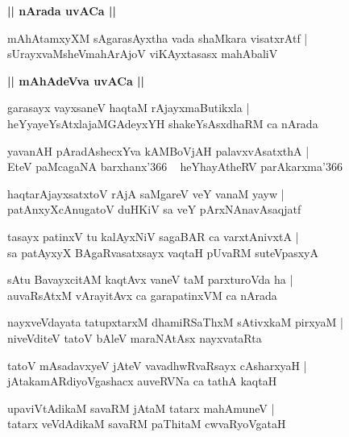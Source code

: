 \documentclass[twoside,12pt,openright]{book}
\newcounter{shloka}[chapter]
\def\uvaca#1{\centerline{{\large\textbf{#1}}}}
\begin{document}
\uvaca{|| nArada uvACa ||}

\begin{shloka}%
mAhAtamxyXM sAgarasAyxtha vada shaMkara visatxrAtf |\\
sUrayxvaMsheVmahArAjoV viKAyxtasasx mahAbaliV 
\end{shloka}

\uvaca{|| mAhAdeVva uvACa ||}

\begin{shloka}%
garasayx vayxsaneV haqtaM rAjayxmaButikxla |\\
heYyayeYsAtxlajaMGAdeyxYH shakeYsAsxdhaRM ca nArada
\end{shloka}

\begin{shloka}%
yavanAH pAradAshecxYva kAMBoVjAH palavxvAsatxthA |\\
EteV paMcagaNA barxhanx\char'366 ~ heYhayAtheRV parAkarxma\char'366 ~
\end{shloka}

\begin{shloka}%
haqtarAjayxsatxtoV rAjA saMgareV veY vanaM yayw |\\
patAnxyXcAnugatoV duHKiV sa veY pArxNAnavAsaqjatf
\end{shloka}

\begin{shloka}%
tasayx patinxV tu kalAyxNiV sagaBAR ca varxtAnivxtA |\\
sa patAyxyX BAgaRvasatxsayx vaqtaH pUvaRM suteVpasxyA 
\end{shloka}

\begin{shloka}%
sAtu BavayxcitAM kaqtAvx vaneV taM parxturoVda ha |\\
auvaRsAtxM vArayitAvx ca garapatinxVM ca nArada 
\end{shloka}

\begin{shloka}%
nayxveVdayata tatupxtarxM dhamiRSaThxM sAtivxkaM pirxyaM |\\
niveVditeV tatoV bAleV maraNAtAsx nayxvataRta 
\end{shloka}

\begin{shloka}%
tatoV mAsadavxyeV jAteV vavadhwRvaRsayx cAsharxyaH |\\
jAtakamARdiyoVgashacx auveRVNa ca tathA kaqtaH 
\end{shloka}

\begin{shloka}%
upaviVtAdikaM savaRM jAtaM tatarx mahAmuneV |\\
tatarx veVdAdikaM savaRM paThitaM cwvaRyoVgataH 
\end{shloka}
\end{document}
